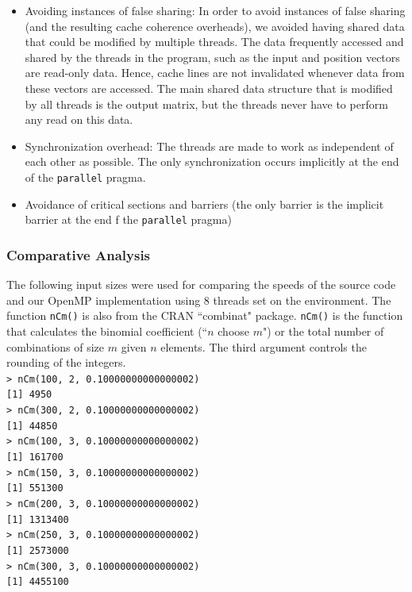 \begin{itemize}
\item Avoiding instances of false sharing: In order to avoid instances of false sharing (and the resulting cache coherence overheads), we avoided having shared data that could be modified by multiple threads. The data frequently accessed and shared by the threads in the program, such as the input and position vectors are read-only data. Hence, cache lines are not invalidated whenever data from these vectors are accessed. The main shared data structure that is modified by all threads is the output matrix, but the threads never have to perform any read on this data.

\item Synchronization overhead: The threads are made to work as independent of each other as possible. The only synchronization occurs implicitly at the end of the \texttt{parallel} pragma.

\item Avoidance of critical sections and barriers (the only barrier is the implicit barrier at the end f the \texttt{parallel} pragma)

\end{itemize}


\subsubsection{Comparative Analysis}
The following input sizes were used for comparing the speeds of the source code and our OpenMP implementation using 8 threads set on the environment. The function \texttt{nCm()} is also from the CRAN ``combinat" package. \texttt{nCm()} is the function that calculates the binomial coefficient (``$n$ choose $m$") or the total number of combinations of size $m$ given $n$ elements. The third argument controls the rounding of the integers. \cite{crandoc}\\
\null
\texttt{> nCm(100, 2, 0.10000000000000002)}\\
\texttt{[1] 4950}\\
\texttt{> nCm(300, 2, 0.10000000000000002)}\\
\texttt{[1] 44850}\\
\texttt{> nCm(100, 3, 0.10000000000000002)}\\
\texttt{[1] 161700}\\
\texttt{> nCm(150, 3, 0.10000000000000002)}\\
\texttt{[1] 551300}\\
\texttt{> nCm(200, 3, 0.10000000000000002)}\\
\texttt{[1] 1313400}\\
\texttt{> nCm(250, 3, 0.10000000000000002)}\\
\texttt{[1] 2573000}\\
\texttt{> nCm(300, 3, 0.10000000000000002)}\\
\texttt{[1] 4455100}\\
\null

